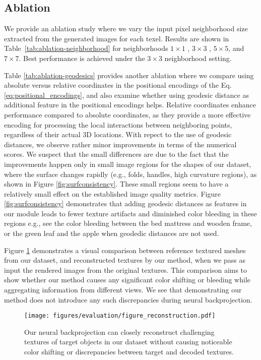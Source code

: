 \subsection{Ablation}
\label{subsec:ablation}

We provide an ablation study where we vary the input pixel neighborhood size extracted from the generated images
for each texel. Results are shown in  Table~\ref{tab:ablation-neighborhood} for neighborhoods $1 \times 1$ , $3 \times 3$ , $5 \times 5$, and $7 \times 7$. Best performance is achieved under the $3 \times 3$ neighborhood setting. 

Table \ref{tab:ablation-geodesics} provides another ablation where we compare using absolute versus relative coordinates in the positional encodings of the Eq. \ref{eq:positional_encodings}, and also examine whether using geodesic distance as additional feature in the positional encodings helps. Relative coordinates enhance performance compared to absolute coordinates, as they provide a more effective encoding for processing the local interactions between neighboring points, regardless of their actual 3D locations. With repect to the use of geodesic distances, we observe rather minor improvements in terms of the numerical scores. We suspect that the small differences are due to the fact that the improvements happen only in small image regions for the shapes of our dataset,
where the surface changes rapidly (e.g., folds, handles, high curvature regions), as shown in Figure \ref{fig:surfconsistency}. These small regions seem to have a relatively small effect on the established image quality metrics. 
Figure \ref{fig:surfconsistency} demonstrates  that adding geodesic distances as features in our module leads to fewer texture artifacts and diminished color bleeding in these regions e.g., see the color bleeding between the bed mattress and wooden frame, or the green leaf and the apple when geodedic distances are not used. 

Figure \ref{fig:fig_reconstruction} demonstrates a visual comparison between reference textured meshes from our dataset, and reconstructed textures by our method, when we pass as input the rendered images from the original textures. This comparison aims to show whether our method causes any significant color shifting or bleeding while aggregating information from different views. We see that demonstrating our method does not introduce any such discrepancies during neural backprojection.
\begin{figure}[!t]
    \texttt{[image: figures/evaluation/figure\_reconstruction.pdf]}
     \vspace*{-5mm}
    \caption{Our neural backprojection can closely reconstruct challenging textures of target objects in our dataset without  causing noticeable color shifting or discrepancies between target and decoded textures.}
    \label{fig:fig_reconstruction}
    \vspace*{-5mm}
\end{figure}

